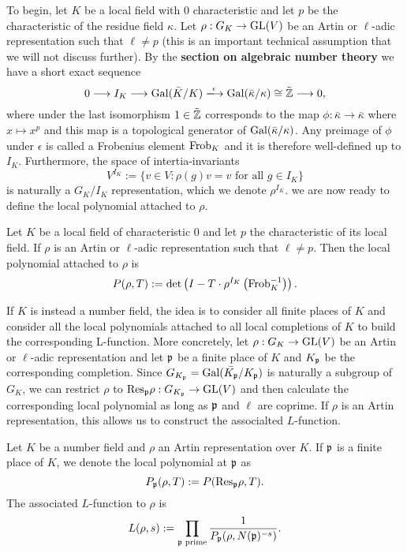 To begin, let $K$ be a local field with $0$ characteristic and let $p$ be the characteristic of the residue field $\kappa$. Let $\rho:G_K\to\mathrm{GL}(V)$ be an Artin or $\ell$-adic representation such that $\ell\neq p$ (this is an important technical assumption that we will not discuss further). By the \textbf{section on algebraic number theory} we have a short exact sequence
$$0\longrightarrow I_K\longrightarrow \Gal(\bar{K}/K)\xlongrightarrow{\epsilon} \Gal(\bar{\kappa}/\kappa)\cong\tilde{\ZZ}\longrightarrow 0,$$
where under the last isomorphism $1\in\tilde{\mathbb{Z}}$ corresponds to the map $\phi:\bar{\kappa}\to\bar{\kappa}$ where $x\mapsto x^p$ and this map is a topological generator of $\mathrm{Gal}(\bar\kappa/\kappa)$. Any preimage of $\phi$ under $\epsilon$ is called a Frobenius element $\mathrm{Frob}_K$ and it is therefore well-defined up to $I_K$. Furthermore, the space of intertia-invariants 
$$V^{I_K}:=\{v\in V:\rho(g)v=v\text{ for all }g\in I_K\}$$
is naturally a $G_K/I_K$ representation, which we denote $\rho^{I_K}$. we are now ready to define the local polynomial attached to $\rho$.

\begin{defn}
    Let $K$ be a local field of characteristic $0$ and let $p$ the characteristic of its local field. If $\rho$ is an Artin or $\ell$-adic representation such that $\ell\neq p$. Then the local polynomial attached to $\rho$ is
    $$P(\rho,T):=\det\left(I-T\cdot\rho^{I_K}\left(\mathrm{Frob}_K^{-1}\right)\right).$$  
\end{defn}

If $K$ is instead a number field, the idea is to consider all finite places of $K$ and consider all the local polynomials attached to all local completions of $K$ to build the corresponding L-function. More concretely, let $\rho:G_K\to\mathrm{GL}(V)$ be an Artin or $\ell$-adic representation and let $\mathfrak{p}$ be a finite place of $K$ and $K_{\mathfrak{p}}$ be the corresponding completion. Since $G_{K_{\mathfrak{p}}}=\mathrm{Gal}(\bar{K_{\mathfrak{p}}}/K_{\mathfrak{p}})$ is naturally a subgroup of $G_K$, we can restrict $\rho$ to $\mathrm{Res}_{\mathfrak{p}}\rho:G_{K_{\mathfrak{p}}}\to\mathrm{GL}(V)$ and then calculate the corresponding local polynomial as long as $\mathfrak{p}$ and $\ell$ are coprime. If $\rho$ is an Artin representation, this allows us to construct the associalted $L$-function.

\begin{defn}
    Let $K$ be a number field and $\rho$ an Artin representation over $K$. If $\mathfrak{p}$ is a finite place of $K$, we denote the local polynomial at $\mathfrak{p}$ as 
    $$P_{\mathfrak{p}}(\rho,T):=P(\mathrm{Res}_{\mathfrak{p}}\rho,T).$$
    The associated $L$-function to $\rho$ is 
    $$L(\rho,s):=\prod_{\mathfrak{p}\text{ prime}}\frac{1}{P_{\mathfrak{p}}(\rho,N(\mathfrak{p})^{-s})}.$$
\end{defn}

